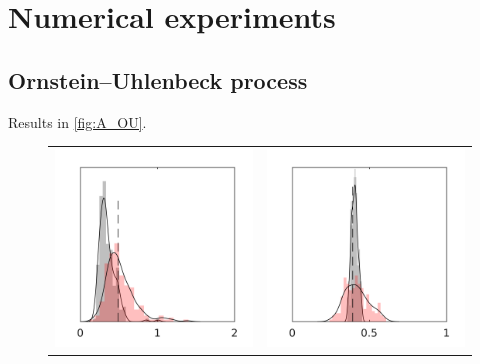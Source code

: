 \documentclass[10pt]{article}
\begin{document}
\section{Numerical experiments}

\subsection{Ornstein--Uhlenbeck process}

Results in \ref{fig:A_OU}.

\begin{figure}
	\centering 
	\begin{tabular}{cc}
	\includegraphics[]{Figures/A_OU.png} & 	\includegraphics[]{Figures/S_OU.png}

\end{tabular}
\end{figure}
\end{document}
